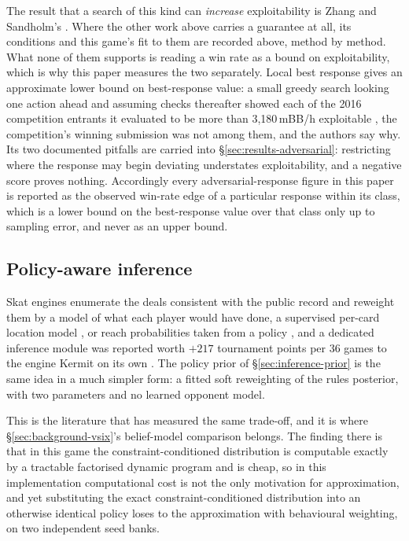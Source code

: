 The result that a search of this kind can \emph{increase} exploitability is Zhang and Sandholm's
\cite{zhang2021subgamesolvingwithoutck}. Where the other work above carries a guarantee at all, its
conditions and this game's fit to them are recorded above, method by method. What none of them
supports is reading a win rate as a bound on exploitability, which is why this paper measures the two
separately. Local best response gives an approximate lower bound on best-response value: a small greedy
search looking one action ahead and assuming checks thereafter showed each of the 2016 competition
entrants it evaluated to be more than 3{,}180\,mBB/h exploitable \cite{lisy2017lbr}, the
competition's winning submission was not among them, and the authors say why. Its two documented
pitfalls are carried into \S\ref{sec:results-adversarial}: restricting where the response may begin
deviating understates exploitability, and a negative score proves nothing. Accordingly every
adversarial-response figure in this paper is reported as the observed win-rate edge of a particular
response within its class, which is a lower bound on the best-response value over that class only up
to sampling error, and never as an upper bound.

\subsection{Policy-aware inference}
\label{sec:related-inference}

Skat engines enumerate the deals consistent with the public record and reweight them by a model of
what each player would have done, a supervised per-card location model
\cite{solinas-supervised}, or reach probabilities taken from a policy \cite{rebstock-inference}, and a dedicated inference module was reported worth $+217$ tournament points per 36 games to the
engine Kermit on its own \cite{buro-kermit}. The policy prior of \S\ref{sec:inference-prior} is the
same idea in a much simpler form: a fitted soft reweighting of the rules posterior, with two
parameters and no learned opponent model.

This is the literature that has measured the same trade-off, and it is where
\S\ref{sec:background-vsix}'s belief-model comparison belongs. The finding there is that in this
game the constraint-conditioned distribution is computable exactly by a tractable factorised
dynamic program and is cheap, so in this implementation computational cost is not the only
motivation for approximation, and yet substituting the exact constraint-conditioned distribution
into an otherwise identical policy loses to the approximation with behavioural weighting, on two
independent seed banks.

